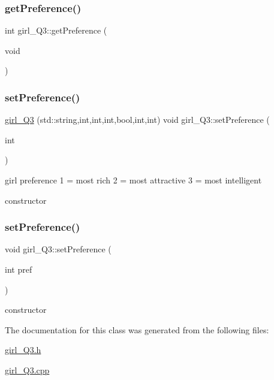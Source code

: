 \mbox{\label{classgirl___q3_a95dbbddc79b5155a877e12e6352e08af}} 
\subsubsection{\texorpdfstring{get\+Preference()}{getPreference()}\hspace{0.1cm}{\footnotesize\ttfamily [2/2]}}
{\footnotesize\ttfamily int girl\+\_\+\+Q3\+::get\+Preference (\begin{DoxyParamCaption}\item[{void}]{ }\end{DoxyParamCaption})}

\mbox{\label{classgirl___q3_aeda05a4272fa1b371c7bbb2285b64e63}} 
\subsubsection{\texorpdfstring{set\+Preference()}{setPreference()}\hspace{0.1cm}{\footnotesize\ttfamily [1/2]}}
{\footnotesize\ttfamily \hyperlink{classgirl___q3}{girl\+\_\+\+Q3} (std\+::string,int,int,int,bool,int,int) void girl\+\_\+\+Q3\+::set\+Preference (\begin{DoxyParamCaption}\item[{int}]{ }\end{DoxyParamCaption})}



girl preference \textquotesingle{}1\textquotesingle{} = most rich \textquotesingle{}2\textquotesingle{} = most attractive \textquotesingle{}3\textquotesingle{} = most intelligent 

constructor \mbox{\label{classgirl___q3_a63eb2d16b6ea6c9c136b376bdfc1c85b}} 
\subsubsection{\texorpdfstring{set\+Preference()}{setPreference()}\hspace{0.1cm}{\footnotesize\ttfamily [2/2]}}
{\footnotesize\ttfamily void girl\+\_\+\+Q3\+::set\+Preference (\begin{DoxyParamCaption}\item[{int}]{pref }\end{DoxyParamCaption})}



constructor 



The documentation for this class was generated from the following files\+:\begin{DoxyCompactItemize}
\item 
\hyperlink{girl___q3_8h}{girl\+\_\+\+Q3.\+h}\item 
\hyperlink{girl___q3_8cpp}{girl\+\_\+\+Q3.\+cpp}\end{DoxyCompactItemize}
